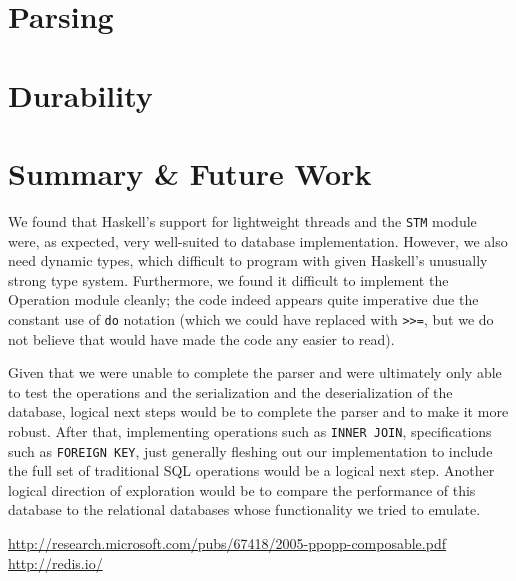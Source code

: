 \documentclass[10pt]{article}
\begin{document}
\begin{multicols}{2}
\section{Parsing}

\section{Durability}

\section{Summary \& Future Work}
We found that Haskell's support for lightweight threads and the \texttt{STM} module were, as expected, very well-suited to database implementation. However, we also need dynamic types, which difficult to program with given Haskell's unusually strong type system. Furthermore, we found it difficult to implement the Operation module cleanly; the code indeed appears quite imperative due the constant use of \texttt{do} notation (which we could have replaced with \texttt{>>=}, but we do not believe that would have made the code any easier to read). 

Given that we were unable to complete the parser and were ultimately only able to test the operations and the serialization and the deserialization of the database, logical next steps would be to complete the parser and to make it more robust. After that, implementing operations such as \texttt{INNER JOIN}, specifications such as \texttt{FOREIGN KEY}, just generally fleshing out our implementation to include the full set of traditional SQL operations would be a logical next step. Another logical direction of exploration would be to compare the performance of this database to the relational databases whose functionality we tried to emulate.

\end{multicols}

\begin{thebibliography}{1}

 \url{http://research.microsoft.com/pubs/67418/2005-ppopp-composable.pdf}
 \url{http://redis.io/}

\end{thebibliography}
\end{document}
